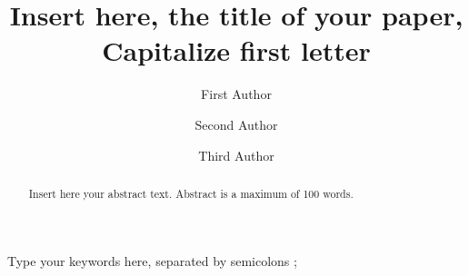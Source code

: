 \documentclass[5p,times,procedia]{elsarticle}
\begin{document}
\begin{frontmatter}



%

\title{Insert here, the title of your paper, Capitalize first letter}




\author[a]{First Author} 
\author[b]{Second Author}
\author[a,b]{Third Author\corref{*}}

\address[a]{First affiliation, Address, City and Postcode, Country}
\address[b]{Second affiliation, Address, City and Postcode, Country}


\begin{abstract}
Insert here your abstract text. Abstract is a maximum of 100 words.
\end{abstract}

\begin{keyword}
Type your keywords here, separated by semicolons ; 




\end{keyword}

\end{frontmatter}
\end{document}
